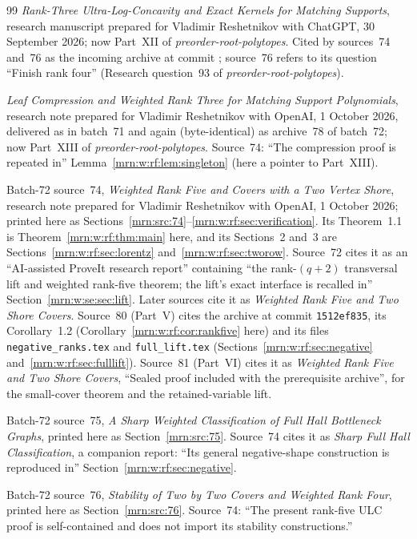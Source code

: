 \documentclass[11pt,a4paper]{article}
\theoremstyle{remark}\newtheorem{remark}[theorem]{Remark}
\newcommand{\prp}{\emph{preorder-root-polytopes}}
\begin{document}
\begin{thebibliography}{99}
\emph{Rank-Three Ultra-Log-Concavity and Exact Kernels for Matching
Supports}, research manuscript prepared for Vladimir Reshetnikov with
ChatGPT, 30 September 2026; now Part~XII of \prp. Cited by sources~74 and~76
as the incoming archive  at commit
; source~76 refers to its
question ``Finish rank four'' (Research question~93 of \prp).

\emph{Leaf Compression and Weighted Rank Three for Matching Support
Polynomials}, research note prepared for Vladimir Reshetnikov with OpenAI,
1 October 2026, delivered as 
in batch~71 and again (byte-identical) as archive~78 of batch~72; now
Part~XIII of \prp. Source~74: ``The compression proof is repeated in''
Lemma~\ref{mrn:w:rf:lem:singleton} (here a pointer to Part~XIII).

Batch-72 source~74, \emph{Weighted Rank Five and Covers with a Two Vertex
Shore}, research note prepared for Vladimir Reshetnikov with OpenAI,
1 October 2026; printed here as Sections~\ref{mrn:src:74}--\ref{mrn:w:rf:sec:verification}.
Its Theorem~1.1 is Theorem~\ref{mrn:w:rf:thm:main} here, and its Sections~2
and~3 are Sections~\ref{mrn:w:rf:sec:lorentz} and~\ref{mrn:w:rf:sec:tworow}. Source~72 cites it as an
``AI-assisted ProveIt research report'' containing ``the rank-$(q+2)$
transversal lift and weighted rank-five theorem; the lift's exact interface
is recalled in'' Section~\ref{mrn:w:se:sec:lift}.
Later sources cite it as \emph{Weighted Rank Five and Two Shore Covers}.
Source~80 (Part~V) cites the archive at commit \texttt{1512ef835}, its
Corollary~1.2 (Corollary~\ref{mrn:w:rf:cor:rankfive} here) and its files
\texttt{negative\_ranks.tex} and \texttt{full\_lift.tex}
(Sections~\ref{mrn:w:rf:sec:negative} and~\ref{mrn:w:rf:sec:fulllift}).
Source~81 (Part~VI) cites it as \emph{Weighted Rank Five and Two Shore
Covers}, ``Sealed proof included with the prerequisite archive'', for the
small-cover theorem and the retained-variable lift.

Batch-72 source~75, \emph{A Sharp Weighted Classification of Full Hall
Bottleneck Graphs}, printed here as Section~\ref{mrn:src:75}. Source~74 cites
it as \emph{Sharp Full Hall Classification}, a companion report: ``Its
general negative-shape construction is reproduced in''
Section~\ref{mrn:w:rf:sec:negative}.

Batch-72 source~76, \emph{Stability of Two by Two Covers and Weighted Rank
Four}, printed here as Section~\ref{mrn:src:76}. Source~74: ``The present
rank-five ULC proof is self-contained and does not import its stability
constructions.''


\end{thebibliography}
\end{document}
